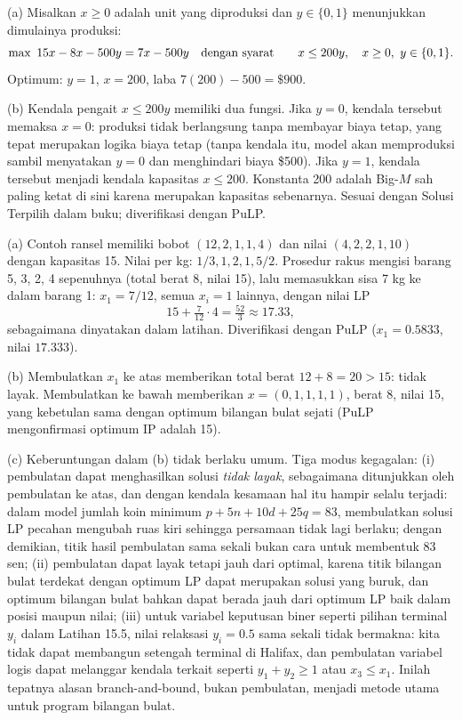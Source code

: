 
(a) Misalkan $x \geq 0$ adalah unit yang diproduksi dan $y \in \{0,1\}$ menunjukkan dimulainya produksi:
\[
\max\ 15x - 8x - 500y = 7x - 500y
\quad \mbox{dengan syarat}\quad \quad
x \leq 200y,\quad x \geq 0,\ y \in \{0,1\}.
\]
Optimum: $y = 1$, $x = 200$, laba $7(200) - 500 = \$900$.

(b) Kendala pengait $x \leq 200y$ memiliki dua fungsi. Jika $y = 0$, kendala tersebut memaksa $x = 0$: produksi tidak berlangsung tanpa membayar biaya tetap, yang tepat merupakan logika biaya tetap (tanpa kendala itu, model akan memproduksi sambil menyatakan $y = 0$ dan menghindari biaya \$500). Jika $y = 1$, kendala tersebut menjadi kendala kapasitas $x \leq 200$. Konstanta 200 adalah Big-$M$ sah paling ketat di sini karena merupakan kapasitas sebenarnya. Sesuai dengan Solusi Terpilih dalam buku; diverifikasi dengan PuLP.


(a) Contoh ransel memiliki bobot $(12, 2, 1, 1, 4)$ dan nilai $(4, 2, 2, 1, 10)$ dengan kapasitas 15. Nilai per kg: $1/3, 1, 2, 1, 5/2$. Prosedur rakus mengisi barang 5, 3, 2, 4 sepenuhnya (total berat 8, nilai 15), lalu memasukkan sisa 7 kg ke dalam barang 1: $x_1 = 7/12$, semua $x_i = 1$ lainnya, dengan nilai LP
\[
15 + \tfrac{7}{12}\cdot 4 = \tfrac{52}{3} \approx 17.33,
\]
sebagaimana dinyatakan dalam latihan. Diverifikasi dengan PuLP ($x_1 = 0.5833$, nilai $17.333$).

(b) Membulatkan $x_1$ ke atas memberikan total berat $12 + 8 = 20 > 15$: tidak layak. Membulatkan ke bawah memberikan $x = (0,1,1,1,1)$, berat 8, nilai 15, yang kebetulan sama dengan optimum bilangan bulat sejati (PuLP mengonfirmasi optimum IP adalah 15).

(c) Keberuntungan dalam (b) tidak berlaku umum. Tiga modus kegagalan: (i) pembulatan dapat menghasilkan solusi \emph{tidak layak}, sebagaimana ditunjukkan oleh pembulatan ke atas, dan dengan kendala kesamaan hal itu hampir selalu terjadi: dalam model jumlah koin minimum $p + 5n + 10d + 25q = 83$, membulatkan solusi LP pecahan mengubah ruas kiri sehingga persamaan tidak lagi berlaku; dengan demikian, titik hasil pembulatan sama sekali bukan cara untuk membentuk 83 sen; (ii) pembulatan dapat layak tetapi jauh dari optimal, karena titik bilangan bulat terdekat dengan optimum LP dapat merupakan solusi yang buruk, dan optimum bilangan bulat bahkan dapat berada jauh dari optimum LP baik dalam posisi maupun nilai; (iii) untuk variabel keputusan biner seperti pilihan terminal $y_i$ dalam Latihan 15.5, nilai relaksasi $y_i = 0.5$ sama sekali tidak bermakna: kita tidak dapat membangun setengah terminal di Halifax, dan pembulatan variabel logis dapat melanggar kendala terkait seperti $y_1 + y_2 \geq 1$ atau $x_3 \leq x_1$. Inilah tepatnya alasan branch-and-bound, bukan pembulatan, menjadi metode utama untuk program bilangan bulat.

